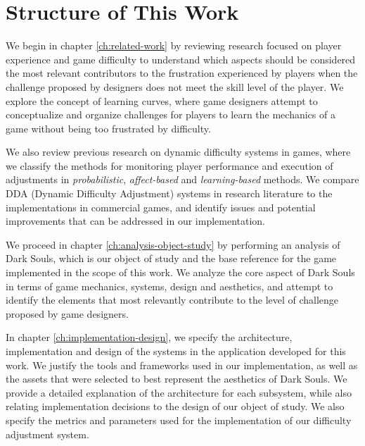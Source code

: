 
\section{Structure of This Work}

We begin in chapter \ref{ch:related-work} by reviewing research focused on player experience and game difficulty to understand which aspects should be considered the most relevant contributors to the frustration experienced by players when the challenge proposed by designers does not meet the skill level of the player. We explore the concept of learning curves, where game designers attempt to conceptualize and organize challenges for players to learn the mechanics of a game without being too frustrated by difficulty.

We also review previous research on dynamic difficulty systems in games, where we classify the methods for monitoring player performance and execution of adjustments in \emph{probabilistic}, \emph{affect-based} and \emph{learning-based} methods. We compare DDA (Dynamic Difficulty Adjustment) systems in research literature to the implementations in commercial games, and identify issues and potential improvements that can be addressed in our implementation.

We proceed in chapter \ref{ch:analysis-object-study} by performing an analysis of Dark Souls, which is our object of study and the base reference for the game implemented in the scope of this work. We analyze the core aspect of Dark Souls in terms of game mechanics, systems, design and aesthetics, and attempt to identify the elements that most relevantly contribute to the level of challenge proposed by game designers.

In chapter \ref{ch:implementation-design}, we specify the architecture, implementation and design of the systems in the application developed for this work. We justify the tools and frameworks used in our implementation, as well as the assets that were selected to best represent the aesthetics of Dark Souls. We provide a detailed explanation of the architecture for each subsystem, while also relating implementation decisions to the design of our object of study. We also specify the metrics and parameters used for the implementation of our difficulty adjustment system.

